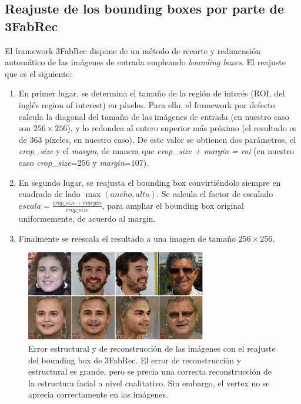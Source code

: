         \subsection{Reajuste de los bounding boxes por parte de 3FabRec}
            \noindent El framework 3FabRec dispone de un método de recorte y redimensión automático de las imágenes de entrada empleando \textit{bounding boxes}. El reajuste que es el siguiente:
            \begin{enumerate}
                \item En primer lugar, se determina el tamaño de la región de interés (ROI, del inglés region of interest) en píxeles. Para ello, el framework por defecto calcula la diagonal del tamaño de las imágenes de entrada (en nuestro caso son $256 \times 256$), y lo redondea al entero superior más próximo (el resultado es de $363$ píxeles, en nuestro caso). De este valor se obtienen dos parámetros, el \textit{crop\_size} y el \textit{margin}, de manera que \textit{crop\_size + margin = roi} (en nuestro caso \textit{crop\_size}=$256$ y \textit{margin}=$107$).
                \item En segundo lugar, se reajusta el bounding box convirtiéndolo siempre en cuadrado de lado $\max(ancho,alto)$. Se calcula el factor de escalado $escala = \frac{crop\_size + margin}{crop\_size}$, para ampliar el bounding box original uniformemente, de acuerdo al margin. 
                \item  Finalmente se reescala el resultado a una imagen de tamaño $256\times 256$.
            \end{enumerate}

            \begin{figure}[!h]
                \centering
                \includegraphics[width=0.7\textwidth]{img/bounding_box_3fabrec.png}
                \caption{Error estructural y de reconstrucción de las imágenes con el reajuste del bounding box de 3FabRec. El error de reconstrucción y estructural es grande, pero se precia una correcta reconstrucción de la estructura facial a nivel cualitativo. Sin embargo, el vertex no se aprecia correctamente en las imágenes.}
                \label{fig:bb_3fabrec}
            \end{figure}

